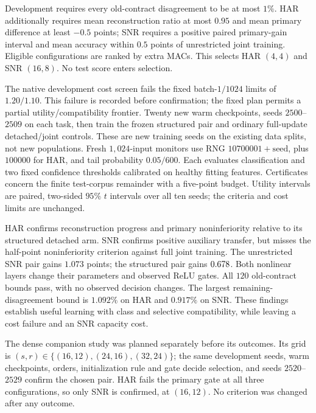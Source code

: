 Development requires every old-contract disagreement to be at most $1\%$.
HAR additionally requires mean reconstruction ratio at most $0.95$ and mean
primary difference at least $-0.5$ points; SNR requires a positive paired
primary-gain interval and mean accuracy within $0.5$ points of unrestricted
joint training. Eligible configurations are ranked by extra MACs. This
selects HAR $(4,4)$ and SNR $(16,8)$. No test score enters selection.

The native development cost screen fails the fixed batch-$1/1024$
limits of $1.20/1.10$. This failure is recorded before confirmation; the
fixed plan permits a partial utility/compatibility frontier. Twenty new warm
checkpoints, seeds $2500$--$2509$ on each task, then train the frozen
structured pair and ordinary full-update detached/joint controls. These are
new training seeds on the existing data splits, not new populations.
Fresh $1{,}024$-input monitors use RNG $10700001+\text{seed}$, plus $100000$
for HAR, and tail probability $0.05/600$. Each evaluates classification and
two fixed confidence thresholds calibrated on healthy fitting features.
Certificates concern the finite test-corpus remainder with a five-point
budget. Utility intervals are paired, two-sided $95\%$ $t$ intervals over
all ten seeds; the criteria and cost limits are unchanged.



HAR confirms reconstruction progress and primary noninferiority relative
to its structured detached arm. SNR confirms positive auxiliary transfer,
but misses the half-point noninferiority criterion against full joint
training. The unrestricted SNR pair gains $1.073$ points; the structured
pair gains $0.678$. Both nonlinear layers change their parameters
and observed ReLU gates. All $120$ old-contract bounds pass, with no
observed decision changes. The largest remaining-disagreement bound is
$1.092\%$ on HAR and $0.917\%$ on SNR. These findings establish useful
learning with class and selective compatibility, while leaving a cost
failure and an SNR capacity cost.

The dense companion study was planned separately before its outcomes. Its
grid is $(s,r)\in\{(16,12),(24,16),(32,24)\}$; the same development seeds,
warm checkpoints, orders, initialization rule and gate decide selection, and
seeds $2520$--$2529$ confirm the chosen pair. HAR fails the primary gate at all
three configurations, so only SNR is confirmed, at $(16,12)$. No criterion was
changed after any outcome.


